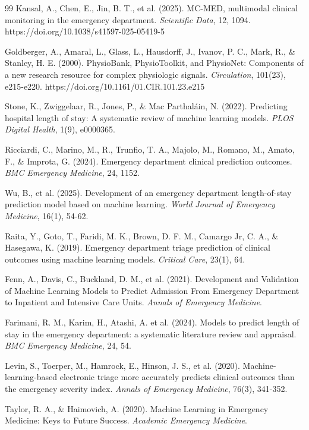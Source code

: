 \documentclass[harvard,article]{frontiersinFPHY_FAMS}
\begin{document}
\begin{thebibliography}{99}
 Kansal, A., Chen, E., Jin, B. T., et al. (2025). MC-MED, multimodal clinical monitoring in the emergency department. \textit{Scientific Data}, 12, 1094. https://doi.org/10.1038/s41597-025-05419-5

 Goldberger, A., Amaral, L., Glass, L., Hausdorff, J., Ivanov, P. C., Mark, R., \& Stanley, H. E. (2000). PhysioBank, PhysioToolkit, and PhysioNet: Components of a new research resource for complex physiologic signals. \textit{Circulation}, 101(23), e215-e220. https://doi.org/10.1161/01.CIR.101.23.e215

 Stone, K., Zwiggelaar, R., Jones, P., \& Mac Parthaláin, N. (2022). Predicting hospital length of stay: A systematic review of machine learning models. \textit{PLOS Digital Health}, 1(9), e0000365.

 Ricciardi, C., Marino, M., R., Trunfio, T. A., Majolo, M., Romano, M., Amato, F., \& Improta, G. (2024). Emergency department clinical prediction outcomes. \textit{BMC Emergency Medicine}, 24, 1152.

 Wu, B., et al. (2025). Development of an emergency department length-of-stay prediction model based on machine learning. \textit{World Journal of Emergency Medicine}, 16(1), 54-62.

 Raita, Y., Goto, T., Faridi, M. K., Brown, D. F. M., Camargo Jr, C. A., \& Hasegawa, K. (2019). Emergency department triage prediction of clinical outcomes using machine learning models. \textit{Critical Care}, 23(1), 64.

 Fenn, A., Davis, C., Buckland, D. M., et al. (2021). Development and Validation of Machine Learning Models to Predict Admission From Emergency Department to Inpatient and Intensive Care Units. \textit{Annals of Emergency Medicine}.

 Farimani, R. M., Karim, H., Atashi, A. et al. (2024). Models to predict length of stay in the emergency department: a systematic literature review and appraisal. \textit{BMC Emergency Medicine}, 24, 54.

 Levin, S., Toerper, M., Hamrock, E., Hinson, J. S., et al. (2020). Machine-learning-based electronic triage more accurately predicts clinical outcomes than the emergency severity index. \textit{Annals of Emergency Medicine}, 76(3), 341-352.

 Taylor, R. A., \& Haimovich, A. (2020). Machine Learning in Emergency Medicine: Keys to Future Success. \textit{Academic Emergency Medicine}.


\end{thebibliography}
\end{document}
